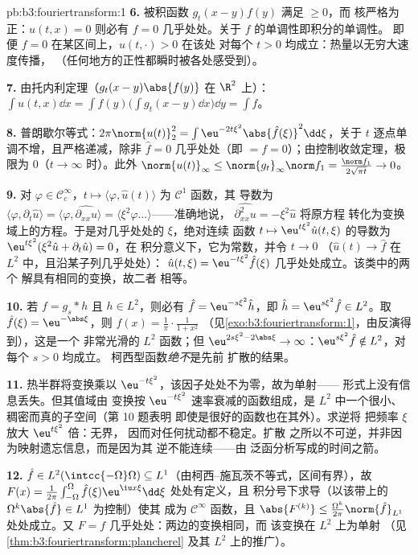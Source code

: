 \begin{solution}{pb:b3:fouriertransform:1}
\textbf{6.} 被积函数 $g_t(x-y)f(y)$ 满足 $\geq 0$，而
核严格为正：$u(t,x) = 0$ 则必有 $f = 0$
几乎处处。关于 $f$ 的单调性即积分的单调性。
即便 $f = 0$ 在某区间上，$u(t, \cdot) > 0$ 在该处
对每个 $t > 0$ 均成立：热量以无穷大速度传播，
（任何地方的正性都瞬时被各处感受到）。

\textbf{7.} 由托内利定理（$g_t(x-y)\abs{f(y)}$ 在
$\R^2$ 上）：$\int u(t,x)\dd x = \int f(y)\bigl(\int g_t(x -
y)\dd x\bigr)\dd y = \int f$。

\textbf{8.} 普朗歇尔等式：$2\pi\norm{u(t)}_2^2 =
\int\eu^{-2t\xi^2}\abs{\hat f(\xi)}^2\dd\xi$，关于
$t$ 逐点单调不增，且严格递减，除非 $\hat f = 0$ 几乎处处（即 $= f =
0$）；由控制收敛定理，极限为 $0$（$t\to\infty$ 时）。此外
$\norm{u(t)}_\infty \leq \norm{g_t}_\infty\norm f_1 =
\frac{\norm f_1}{2\sqrt{\pi t}} \to 0$。

\textbf{9.} 对 $\varphi \in \mathcal C_c^\infty$，$t \mapsto
\langle\varphi, \hat u(t)\rangle$ 为 $\mathcal C^1$ 函数，其
导数为 $\langle\varphi, \partial_t\hat u\rangle =
\langle\varphi, \widehat{\partial_{xx}u}\rangle =
\langle\xi^2\varphi\dots\rangle$——准确地说，
$\widehat{\partial^2_{xx}u} = -\xi^2\hat u$ 将原方程
转化为变换域上的方程。于是对几乎处处的 $\xi$，绝对连续
函数 $t \mapsto \eu^{t\xi^2}\hat u(t,\xi)$ 的导数为
$\eu^{t\xi^2}(\xi^2\hat u + \partial_t\hat u) = 0$，在
积分意义下，它为常数，并令 $t \to 0$
（$\hat u(t) \to \hat f$ 在 $L^2$ 中，且沿某子列几乎处处）：
$\hat u(t, \xi) = \eu^{-t\xi^2}\hat f(\xi)$ 几乎处处成立。该类中的两个
解具有相同的变换，故二者
相等。

\textbf{10.} 若 $f = g_s * h$ 且 $h \in L^2$，则必有 $\hat f =
\eu^{-s\xi^2}\hat h$，即 $\hat h = \eu^{s\xi^2}\hat f \in
L^2$。取 $\hat f(\xi) = \eu^{-\abs\xi}$，则 $f(x) =
\frac1\pi\cdot\frac1{1 + x^2}$
（见\cref{exo:b3:fouriertransform:1}，由反演得到），这是一个
非常光滑的 $L^2$ 函数；但 $\eu^{2s\xi^2 - 2\abs\xi} \to
\infty$：$\eu^{s\xi^2}\hat f \notin L^2$，对每个 $s > 0$ 均成立。
柯西型函数\emph{绝不}是先前
扩散的结果。

\textbf{11.} 热半群将变换乘以
$\eu^{-t\xi^2}$，该因子处处不为零，故为单射——
形式上没有信息丢失。但其值域由
变换按 $\eu^{-t\xi^2}$ 速率衰减的函数组成，是
$L^2$ 中一个很小、稠密而真的子空间（第 10 题表明
即使是很好的函数也在其外）。求逆将
把频率 $\xi$ 放大 $\eu^{t\xi^2}$ 倍：无界，
因而对任何扰动都不稳定。扩散
之所以不可逆，并非因为映射遗忘信息，而是因为其
逆不能连续——由
泛函分析写成的时间之箭。

\textbf{12.} $\hat f \in L^2(\intcc{-\Omega}\Omega)
\subseteq L^1$（由柯西--施瓦茨不等式，区间有界），故
$F(x) = \frac1{2\pi}\int_{-\Omega}^\Omega\hat
f(\xi)\eu^{\iu x\xi}\dd\xi$ 处处有定义，且
积分号下求导（以该带上的
$\Omega^k\abs{\hat f} \in L^1$ 为控制）使其
成为 $\mathcal C^\infty$ 函数，且 $\abs{F^{(k)}} \leq
\frac{\Omega^k}{2\pi}\norm{\hat f}_{L^1}$ 处处成立。又 $F
= f$ 几乎处处：两边的变换相同，而
该变换在 $L^2$ 上为单射
（见\cref{thm:b3:fouriertransform:plancherel} 及其
$L^2$ 上的推广）。


\end{solution}
